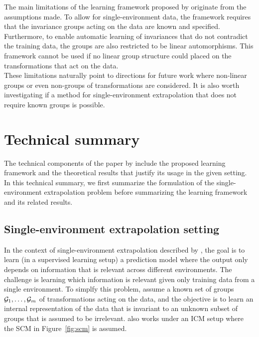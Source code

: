 The main limitations of the learning framework proposed by \textcite{Mouli:2021} originate from the assumptions made. To allow for single-environment data, the framework requires that the invariance groups acting on the data are known and specified. Furthermore, to enable automatic learning of invariances that do not contradict the training data, the groups are also restricted to be linear automorphisms. This framework cannot be used if no linear group structure could placed on the transformations that act on the data.
\\

These limitations naturally point to directions for future work where non-linear groups or even non-groups of transformations are considered. It is also worth investigating if a method for single-environment extrapolation that does not require known groups is possible.


\newpage


\section{Technical summary}

The technical components of the paper by \textcite{Mouli:2021} include the proposed learning framework and the theoretical results that justify its usage in the given setting. In this technical summary, we first summarize the formulation of the single-environment extrapolation problem before summarizing the learning framework and its related results.


\subsection{Single-environment extrapolation setting}

In the context of single-environment extrapolation described by \textcite{Mouli:2021}, the goal is to learn (in a supervised learning setup) a prediction model where the output  only depends on information that is relevant across different environments. The challenge is learning which information is relevant given only training data from a single environment. To simplfy this problem, \citeauthor{Mouli:2021} assume a known set of groups $\mathcal{G}_1,\ldots,\mathcal{G}_m$ of transformations acting on the data, and the objective is to learn an internal representation of the data that is invariant to an unknown subset of groups that is assumed to be irrelevant. \citeauthor{Mouli:2021} also works under an ICM setup where the SCM in Figure~\ref{fig:scm} is assumed.

